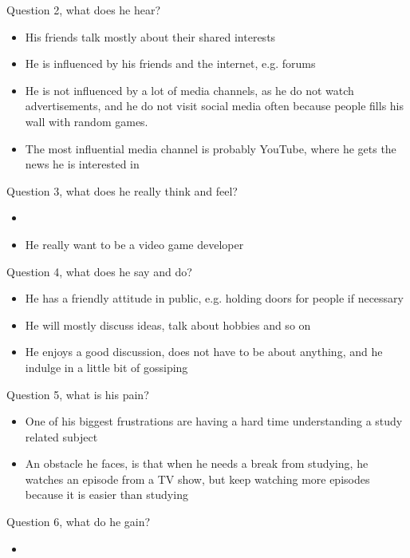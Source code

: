 Question 2, what does he hear?
\begin{itemize}
\item His friends talk mostly about their shared interests
\item He is influenced by his friends and the internet, e.g. forums
\item He is not influenced by a lot of media channels, as he do not watch advertisements, and he do not visit social media often because people fills his wall with random games.
\item The most influential media channel is probably YouTube, where he gets the news he is interested in
\end{itemize}

Question 3, what does he really think and feel?
\begin{itemize}
\item {}
\item He really want to be a video game developer
\end{itemize}

Question 4, what does he say and do?
\begin{itemize}
\item He has a friendly attitude in public, e.g. holding doors for people if necessary
\item He will mostly discuss ideas, talk about hobbies and so on
\item He enjoys a good discussion, does not have to be about anything, and he indulge in a little bit of gossiping 
\end{itemize}

Question 5, what is his pain?
\begin{itemize}
\item One of his biggest frustrations are having a hard time understanding a study related subject
\item An obstacle he faces, is that when he needs a break from studying, he watches an episode from a TV show, but keep watching more episodes because it is easier than studying
\end{itemize}

Question 6, what do he gain?
\begin{itemize}
\item {}
\end{itemize}
